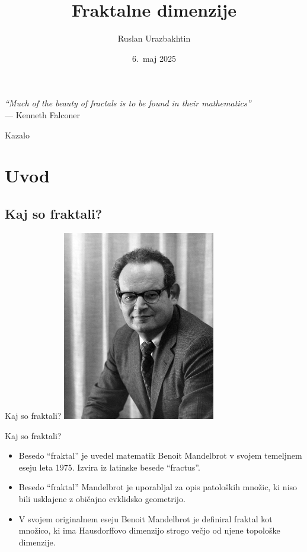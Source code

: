 \documentclass[10pt]{beamer}
\title[Fraktalne dimenzije]{Fraktalne dimenzije}
\author{Ruslan Urazbakhtin}
\institute{Fakulteta za matematiko in fiziko, Univerza v Ljubljani}
\date{6.\ maj 2025}
\begin{document}
\begin{frame}
  \titlepage

  \vfill %

  \begin{flushright}
    \small
    \textit{"`Much of the beauty of fractals is to be found in their mathematics"'} \\
    \hspace{1em} --- Kenneth Falconer
  \end{flushright}
\end{frame}

\begin{frame}{Kazalo}
  \tableofcontents
\end{frame}

\section{Uvod}
\subsection{Kaj so fraktali?}

\begin{frame}{Kaj so fraktali?}
    \centering
    \includegraphics[width=0.5\textwidth]{img/mandelbrot.jpg} 
\end{frame}

\begin{frame}{Kaj so fraktali?}
    \begin{itemize}
        \item Besedo "`fraktal"' je uvedel matematik Benoit Mandelbrot v svojem temeljnem eseju leta 1975. Izvira iz latinske besede "`fractus"'. 
        \item Besedo "`fraktal"' Mandelbrot je uporabljal za opis patoloških množic, ki niso bili usklajene z običajno evklidsko geometrijo.
        \item V svojem originalnem eseju Benoit Mandelbrot je definiral fraktal kot množico, ki ima Hausdorffovo dimenzijo strogo večjo od njene topološke dimenzije. 
    \end{itemize}    
\end{frame}
\end{document}
